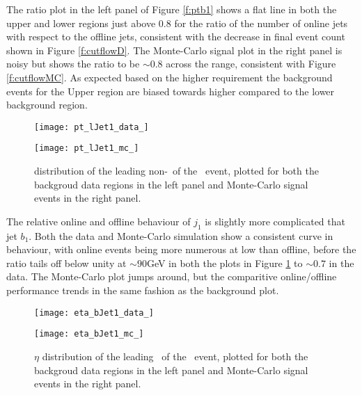     The ratio plot in the left panel of Figure \ref{f:ptb1} shows a flat line in both the upper and lower regions just above $0.8$ for the ratio of the number of online jets with respect to the offline jets, consistent with the decrease in final event count shown in Figure \ref{f:cutflowD}. The Monte-Carlo signal plot in the right panel is noisy but shows the ratio to be $\sim0.8$ across the \pt range, consistent with Figure \ref{f:cutflowMC}. As expected based on the higher \mbb requirement the background events for the Upper region are biased towards higher \pt compared to the lower background region.

        \begin{figure}[h]
            \centering

            \begin{minipage}[h]{0.48\linewidth}
                \texttt{[image: pt\_lJet1\_data\_]}
            \end{minipage}
            \quad
            \begin{minipage}[h]{0.48\linewidth}
                \texttt{[image: pt\_lJet1\_mc\_]}
            \end{minipage}
            \caption[\pt distribution of the leading non-\bjet\ of the \VBFHBB\ event]{\pt distribution of the leading non-\bjet\ of the \VBFHBB\ event, plotted for both the backgroud data regions in the left panel and Monte-Carlo signal events in the right panel.}
            \label{f:ptj1}
        \end{figure}

    The relative online and offline behaviour of $j_1$ is slightly more complicated that jet $b_1$. Both the data and Monte-Carlo simulation show a consistent curve in behaviour, with online events being more numerous at low \pt than offline, before the ratio tails off below unity at $\sim90$GeV in both the plots in Figure \ref{f:ptj1} to $\sim 0.7$ in the data. The Monte-Carlo plot jumps around, but the comparitive online/offline performance trends in the same fashion as the background plot.

        \begin{figure}[h]
            \centering

            \begin{minipage}[h]{0.48\linewidth}
                \texttt{[image: eta\_bJet1\_data\_]}
            \end{minipage}
            \quad
            \begin{minipage}[h]{0.48\linewidth}
                \texttt{[image: eta\_bJet1\_mc\_]}
            \end{minipage}
            \caption[$\eta$ distribution of the leading \bjet\ of the \VBFHBB\ event]{$\eta$ distribution of the leading \bjet\ of the \VBFHBB\ event, plotted for both the backgroud data regions in the left panel and Monte-Carlo signal events in the right panel.}
            \label{f:etab1}
        \end{figure}

